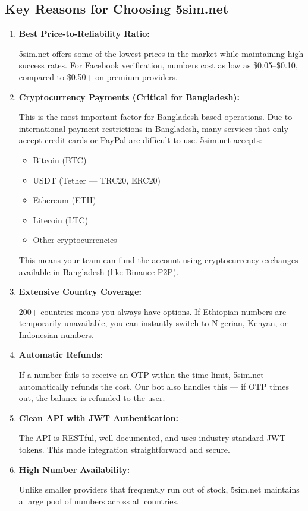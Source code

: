 \subsection{Key Reasons for Choosing 5sim.net}

\begin{enumerate}
    \item \textbf{Best Price-to-Reliability Ratio:}
    
    5sim.net offers some of the lowest prices in the market while maintaining high success rates. For Facebook verification, numbers cost as low as \$0.05--\$0.10, compared to \$0.50+ on premium providers.

    \item \textbf{Cryptocurrency Payments (Critical for Bangladesh):}
    
    \begin{warningbox}
    This is the most important factor for Bangladesh-based operations. Due to international payment restrictions in Bangladesh, many services that only accept credit cards or PayPal are difficult to use. 5sim.net accepts:
    \begin{itemize}
        \item Bitcoin (BTC)
        \item USDT (Tether --- TRC20, ERC20)
        \item Ethereum (ETH)
        \item Litecoin (LTC)
        \item Other cryptocurrencies
    \end{itemize}
    This means your team can fund the account using cryptocurrency exchanges available in Bangladesh (like Binance P2P).
    \end{warningbox}

    \item \textbf{Extensive Country Coverage:}
    
    200+ countries means you always have options. If Ethiopian numbers are temporarily unavailable, you can instantly switch to Nigerian, Kenyan, or Indonesian numbers.

    \item \textbf{Automatic Refunds:}
    
    If a number fails to receive an OTP within the time limit, 5sim.net automatically refunds the cost. Our bot also handles this --- if OTP times out, the balance is refunded to the user.

    \item \textbf{Clean API with JWT Authentication:}
    
    The API is RESTful, well-documented, and uses industry-standard JWT tokens. This made integration straightforward and secure.

    \item \textbf{High Number Availability:}
    
    Unlike smaller providers that frequently run out of stock, 5sim.net maintains a large pool of numbers across all countries.
\end{enumerate}

